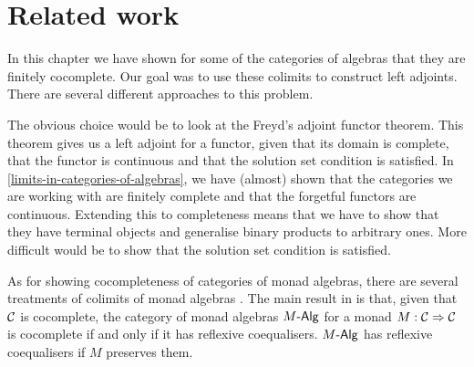 \section{Related work}

In this chapter we have shown for some of the categories of algebras
that they are finitely cocomplete. Our goal was to use these colimits
to construct left adjoints. There are several different approaches to
this problem.

The obvious choice would be to look at the Freyd's adjoint functor
theorem. This theorem gives us a left adjoint for a functor, given
that its domain is complete, that the functor is continuous and that
the solution set condition is satisfied. In
\cref{limits-in-categories-of-algebras}, we have (almost) shown that
the categories we are working with are finitely complete and that the
forgetful functors are continuous. Extending this to completeness
means that we have to show that they have terminal objects and
generalise binary products to arbitrary ones. More difficult would be
to show that the solution set condition is satisfied.

As for showing cocompleteness of categories of monad algebras, there
are several treatments of colimits of monad algebras
\cite{Linton1969,Barr1985}. The main result in \cite{Linton1969} is
that, given that $\mathcal{C}$ is cocomplete, the category of monad algebras
$\monalgcat{M}$ for a monad $M : \mathcal{C} \Rightarrow \mathcal{C}$ is cocomplete if and
only if it has reflexive coequalisers. $\monalgcat{M}$ has reflexive
coequalisers if $M$ preserves them.
